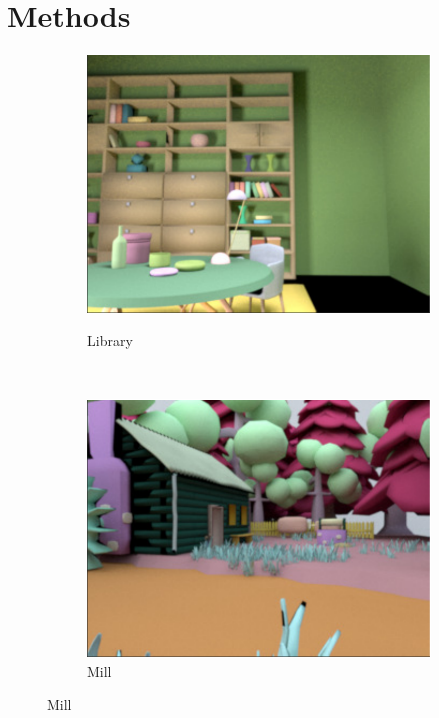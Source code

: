 \documentclass{jov}
\begin{document}
\section*{Methods} \label{Methods}
\begin{figure}
\centering
\begin{subfigure}[b]{0.22 \textwidth}
        \caption{Library }
        \includegraphics[width=\textwidth]{../FiguresDraft5/Figure2/Figure2_a.pdf}
        \label{fig:baseSceneLibrary}
    \end{subfigure}
    ~
    \begin{subfigure}[b]{0.22 \textwidth}
        \caption{Mill}    
        \includegraphics[width=\textwidth]{../FiguresDraft5/Figure2/Figure2_b.pdf}

\end{subfigure}
\end{figure}
\end{document}
